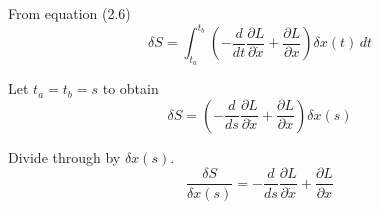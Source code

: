 


From equation (2.6)
\begin{equation*}
\delta S=\int_{t_a}^{t_b}\left(-\frac{d}{dt}\frac{\partial L}{\partial\dot x}
+\frac{\partial L}{\partial x}\right)\delta x(t)\,dt
\end{equation*}

Let $t_a=t_b=s$ to obtain
\begin{equation*}
\delta S=\left(-\frac{d}{ds}\frac{\partial L}{\partial\dot x}
+\frac{\partial L}{\partial x}\right)\delta x(s)
\end{equation*}

Divide through by $\delta x(s)$.
\begin{equation*}
\frac{\delta S}{\delta x(s)}=
-\frac{d}{ds}\frac{\partial L}{\partial\dot x}
+\frac{\partial L}{\partial x}
\end{equation*}


